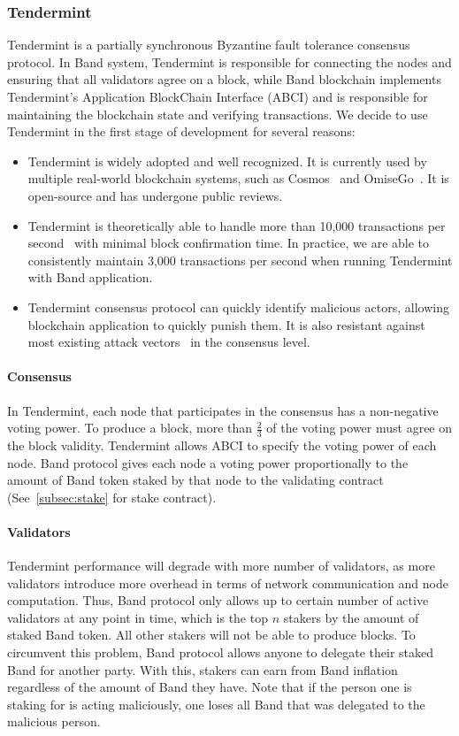 \documentclass[letterpaper,11pt]{article}
\begin{document}
\subsubsection{Tendermint}
Tendermint is a partially synchronous Byzantine fault tolerance consensus protocol. In Band system, Tendermint is responsible for connecting the nodes and ensuring that all validators agree on a block, while Band blockchain implements Tendermint's Application BlockChain Interface (ABCI) and is responsible for maintaining the blockchain state and verifying transactions. We decide to use Tendermint in the first stage of development for several reasons:

\begin{itemize}
\setlength\itemsep{0em}
\item Tendermint is widely adopted and well recognized. It is currently used by multiple real-world blockchain systems, such as Cosmos~\cite{cosmoswhitepaper} and OmiseGo~\cite{omgtendermint}. It is open-source and has undergone public reviews.
\item Tendermint is theoretically able to handle more than 10,000 transactions per second~\cite{tendermint10k} with minimal block confirmation time. In practice, we are able to consistently maintain 3,000 transactions per second when running Tendermint with Band application.
\item Tendermint consensus protocol can quickly identify malicious actors, allowing blockchain application to quickly punish them. It is also resistant against most existing attack vectors~\cite{buchman2016tendermint} in the consensus level. 
\end{itemize}

\paragraph{Consensus}
In Tendermint, each node that participates in the consensus has a non-negative voting power. To produce a block, more than $\frac{2}{3}$ of the voting power must agree on the block validity. Tendermint allows ABCI to specify the voting power of each node. Band protocol gives each node a voting power proportionally to the amount of Band token staked by that node to the validating contract (See~\cref{subsec:stake} for stake contract).

\paragraph{Validators}
Tendermint performance will degrade with more number of validators, as more validators introduce more overhead in terms of network communication and node computation. Thus, Band protocol only allows up to certain number of active validators at any point in time, which is the top $n$ stakers by the amount of staked Band token. All other stakers will not be able to produce blocks. To circumvent this problem, Band protocol allows anyone to delegate their staked Band for another party. With this, stakers can earn from Band inflation regardless of the amount of Band they have. Note that if the person one is staking for is acting maliciously, one loses all Band that was delegated to the malicious person.   
\end{document}
